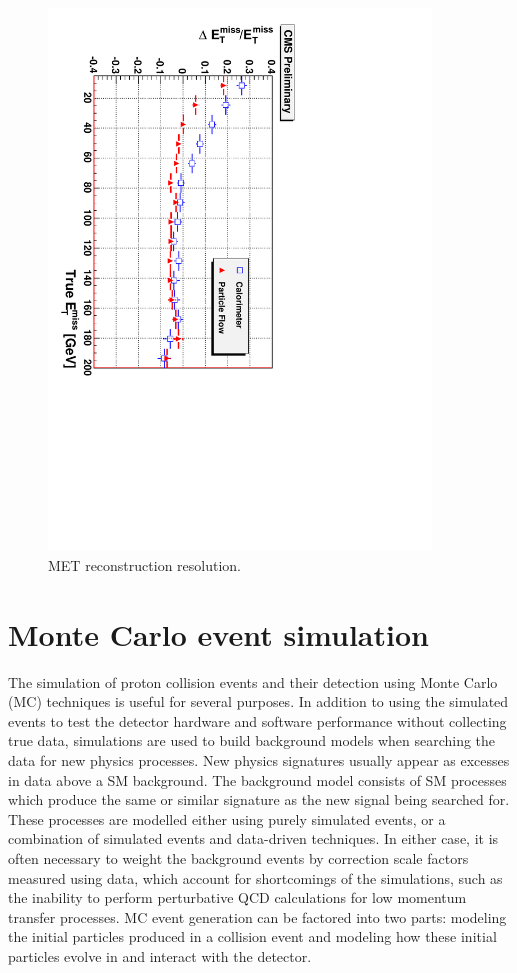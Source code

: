 \begin{figure}[tbh]
\centering
\includegraphics[width=4in]{figures/pfmetres.pdf}
\caption{MET reconstruction resolution.}
\label{fig:pfmetres}
\end{figure}

\section{Monte Carlo event simulation}

The simulation of proton collision events and their detection using Monte Carlo (MC) techniques is useful for several purposes. In addition to using the simulated events to test the detector hardware and software performance without collecting true data, simulations are used to build background models when searching the data for new physics processes. New physics signatures usually appear as excesses in data above a SM background. The background model consists of SM processes which produce the same or similar signature as the new signal being searched for. These processes are modelled either using purely simulated events, or a combination of simulated events and data-driven techniques. In either case, it is often necessary to weight the background events by correction scale factors measured using data, which account for shortcomings of the simulations, such as the inability to perform perturbative QCD calculations for low momentum transfer processes. MC event generation can be factored into two parts: modeling the initial particles produced in a collision event and modeling how these initial particles evolve in and interact with the detector.

